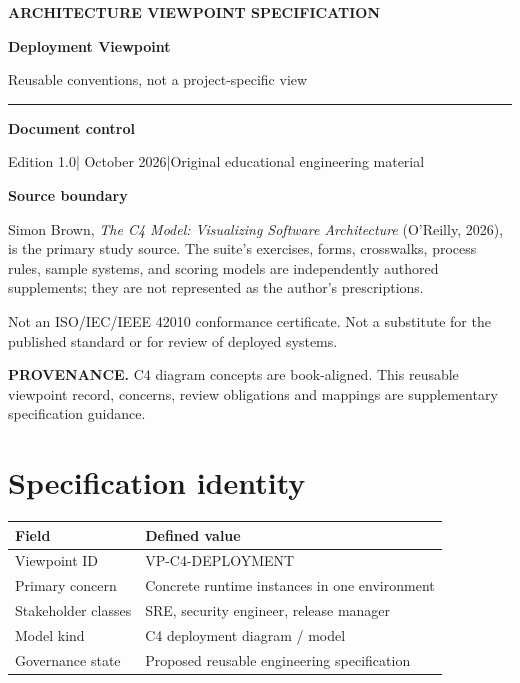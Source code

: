 \documentclass[10pt,letterpaper]{article}
\newcommand{\SourceNote}[1]{\par\smallskip\noindent\colorbox{C4Light}{\parbox{0.94\linewidth}{\footnotesize\textbf{PROVENANCE.} #1}}\par\medskip}
\newcommand{\DocStart}[3]{%
\begin{document}
\begin{titlepage}
\renewcommand{\thepage}{title-\arabic{page}}
\vspace*{0.55in}
{\sffamily\bfseries\small\color{C4Teal}#1}\par\vspace{0.24in}
{\sffamily\bfseries\fontsize{26}{31}\selectfont\color{C4Navy}#2}\par\vspace{0.18in}
{\large\color{C4Gray}#3}\par\vspace{0.4in}
\textcolor{C4Teal}{\rule{\linewidth}{1.15pt}}\par\vspace{0.24in}
\textbf{Document control}\par
Edition 1.0\quad|\quad 30 October 2026\quad|\quad Original educational engineering material\par
\vspace{0.17in}
\textbf{Source boundary}\par
Simon Brown, \emph{The C4 Model: Visualizing Software Architecture} (O'Reilly, 2026), is the primary study source. The suite's exercises, forms, crosswalks, process rules, sample systems, and scoring models are independently authored supplements; they are not represented as the author's prescriptions.\par
\vfill
{\small\color{C4Gray}Not an ISO/IEC/IEEE 42010 conformance certificate. Not a substitute for the published standard or for review of deployed systems.}\par
\end{titlepage}
}
\DocStart{ARCHITECTURE VIEWPOINT SPECIFICATION}{Deployment Viewpoint}{Reusable conventions, not a project-specific view}
\SourceNote{C4 diagram concepts are book-aligned. This reusable viewpoint record, concerns, review obligations and mappings are supplementary specification guidance.}
\section{Specification identity}
\begin{tabularx}{\linewidth}{@{}YY@{}}\toprule
\textbf{Field} & \textbf{Defined value} \\ \midrule
Viewpoint ID & VP-C4-DEPLOYMENT \\
Primary concern & Concrete runtime instances in one environment \\
Stakeholder classes & SRE, security engineer, release manager \\
Model kind & C4 deployment diagram / model \\
Governance state & Proposed reusable engineering specification \\
\bottomrule\end{tabularx}
\end{document}
